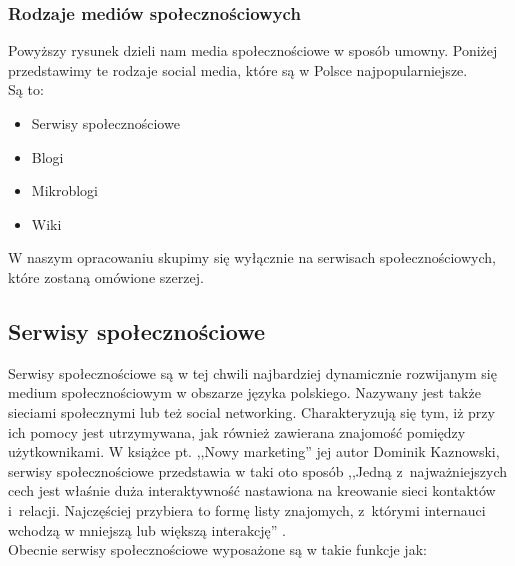 \subsubsection{Rodzaje mediów społecznościowych}

Powyższy rysunek dzieli nam media społecznościowe w sposób umowny. Poniżej przedstawimy te rodzaje social media, które są w Polsce najpopularniejsze.\\

\noindent Są to:

\begin{itemize}
\item Serwisy społecznościowe
\item Blogi
\item Mikroblogi
\item Wiki
\end{itemize}

W naszym opracowaniu skupimy się wyłącznie na serwisach społecznościowych, które zostaną omówione szerzej.

\subsection{Serwisy społecznościowe}

Serwisy społecznościowe są w tej chwili najbardziej dynamicznie rozwijanym się medium społecznościowym w obszarze języka polskiego. Nazywany jest także sieciami społecznymi lub też social networking. Charakteryzują się tym, iż przy ich pomocy jest utrzymywana, jak również zawierana znajomość pomiędzy użytkownikami. W książce pt. ,,Nowy marketing'' jej autor Dominik Kaznowski, serwisy społecznościowe przedstawia w taki oto sposób ,,Jedną z~najważniejszych cech jest właśnie duża interaktywność nastawiona na kreowanie sieci kontaktów i~relacji. Najczęściej przybiera to formę listy znajomych, z~którymi internauci wchodzą w mniejszą lub większą interakcję'' \cite{url:kursusability-social-media}.\\

\noindent Obecnie serwisy społecznościowe wyposażone są w takie funkcje jak:


